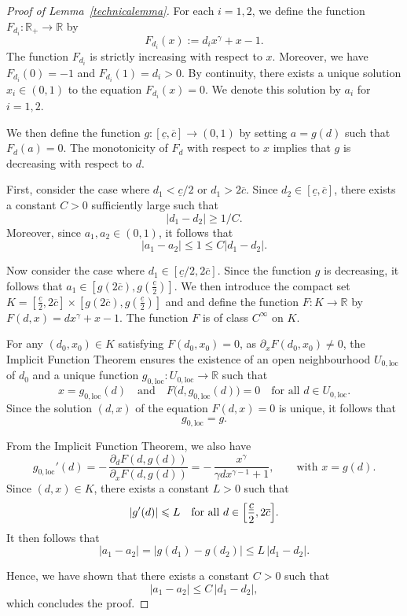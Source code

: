 \documentclass[11pt, twoside, a4paper]{article}
\theoremstyle{plain}
\theoremstyle{remark}
\numberwithin{equation}{section}
\renewcommand{\leq}{\leqslant}\renewcommand{\le}{\leqslant}
\renewcommand{\geq}{\geqslant}\renewcommand{\ge}{\geqslant}
\begin{document}
\begin{proof}[Proof of Lemma~\ref{technicalemma}]
For each $i =1,2$, we define the function $F_{d_i} : \mathbb{R}_+ \to \mathbb{R}$ by
\[
F_{d_i}(x) := d_i x^\gamma + x - 1.
\]
The function $F_{d_i}$ is strictly increasing with respect to $x$. Moreover, we have
$F_{d_i}(0) = -1$ and $F_{d_i}(1) = d_i > 0$.
By continuity, there exists a unique solution $x_i \in (0,1)$ to the equation
$F_{d_i}(x) = 0$.
We denote this solution by $a_i$ for $i = 1,2$.

We then define the function $g:[\underline{c},\overline{c}]\to (0,1)$ by setting $a = g(d)$ such that $F_d(a)=0$. The monotonicity of $F_{d}$ with respect to $x$ implies that $g$ is decreasing with respect to $d$.

First, consider the case where $d_1 < \underline{c}/2$ or $d_1 > 2\overline{c}$. Since $d_2 \in [\underline{c}, \overline{c}]$, there exists a constant $C > 0$ sufficiently large such that
\[
|d_1 - d_2| \geq 1/C.
\]
Moreover, since $a_1, a_2 \in (0,1)$, it follows that
\[
|a_1 - a_2| \leq 1 \leq C |d_1 - d_2|.
\]

Now consider the case where $d_1 \in [\underline{c}/2,2 \overline{c}]$. Since the function $g$ is decreasing, it follows that $a_1 \in [g(2 \overline{c}), g(\frac{\underline{c}}{2})]$. We then introduce the compact set $K = [\frac{\underline{c}}{2},2 \overline{c}] \times [g(2 \overline{c}), g(\frac{\underline{c}}{2})]$ and and define the function $F: K \to \mathbb{R}$ by $F(d,x) = d x^\gamma +x-1$. The function $F$ is of class $C^\infty$ on $K$.

For any $(d_0,x_0) \in K$ satisfying $F(d_0,x_0)=0$, as $\partial_x F(d_0,x_0) \neq 0$, the Implicit Function Theorem ensures the existence of an open neighbourhood $U_{0,\mathrm{loc}}$ of $d_0$ and a unique function $g_{0,\mathrm{loc}} : U_{0,\mathrm{loc}} \to \mathbb{R}$ such that
\[
x = g_{0,\mathrm{loc}}(d)
\quad \text{and} \quad
F\bigl(d, g_{0,\mathrm{loc}}(d)\bigr)=0
\quad \text{for all } d \in U_{0,\mathrm{loc}}.
\]
Since the solution $(d,x)$ of the equation $F(d,x)=0$ is unique, it follows that
\[
g_{0,\mathrm{loc}} = g.
\]


From the Implicit Function Theorem, we also have
\[
g_{0,\mathrm{loc}}'(d) = -\,\frac{\partial_d F(d,g(d))}{\partial_x F(d,g(d))} = -\,\frac{x^\gamma}{\gamma d x^{\gamma-1}+1}, \qquad \text{with } x = g(d).
\]
Since $(d,x) \in K$, there exists a constant $L>0$ such that
\[
\left| g'(d) \right| \le L \quad \text{for all } d \in \Bigl[\frac{\underline{c}}{2},2 \overline{c}\Bigr].
\]
It then follows that
\begin{equation*}
 |a_1 - a_2| = |g(d_1) - g(d_2)| \le L\, |d_1 - d_2|.
\end{equation*}

Hence, we have shown that there exists a constant $C>0$ such that
\[
|a_1 - a_2| \le C\, |d_1 - d_2|,
\]
which concludes the proof.


\end{proof}
\end{document}
